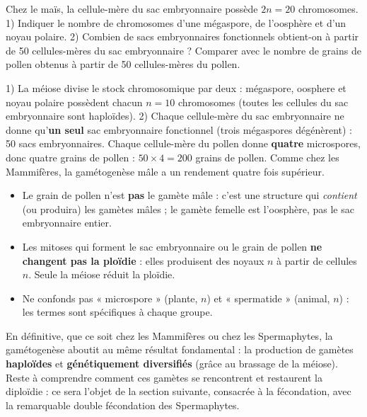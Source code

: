\documentclass[11pt]{article}
\begin{document}
\begin{exercice}
Chez le maïs, la cellule-mère du sac embryonnaire possède $2n = 20$ chromosomes. 1) Indiquer le nombre de chromosomes d'une mégaspore, de l'oosphère et d'un noyau polaire. 2) Combien de sacs embryonnaires fonctionnels obtient-on à partir de 50 cellules-mères du sac embryonnaire ? Comparer avec le nombre de grains de pollen obtenus à partir de 50 cellules-mères du pollen.
\end{exercice}

\begin{corrige}[Exercice]
1) La méiose divise le stock chromosomique par deux : mégaspore, oosphere et noyau polaire possèdent chacun $n = 10$ chromosomes (toutes les cellules du sac embryonnaire sont haploïdes). 2) Chaque cellule-mère du sac embryonnaire ne donne qu'\textbf{un seul} sac embryonnaire fonctionnel (trois mégaspores dégénèrent) : 50 sacs embryonnaires. Chaque cellule-mère du pollen donne \textbf{quatre} microspores, donc quatre grains de pollen : $50 \times 4 = 200$ grains de pollen. Comme chez les Mammifères, la gamétogenèse mâle a un rendement quatre fois supérieur.
\end{corrige}

\begin{attention}
\begin{itemize}
\item Le grain de pollen n'est \textbf{pas} le gamète mâle : c'est une structure qui \emph{contient} (ou produira) les gamètes mâles ; le gamète femelle est l'oosphère, pas le sac embryonnaire entier.
\item Les mitoses qui forment le sac embryonnaire ou le grain de pollen \textbf{ne changent pas la ploïdie} : elles produisent des noyaux $n$ à partir de cellules $n$. Seule la méiose réduit la ploïdie.
\item Ne confonds pas « microspore » (plante, $n$) et « spermatide » (animal, $n$) : les termes sont spécifiques à chaque groupe.
\end{itemize}
\end{attention}

En définitive, que ce soit chez les Mammifères ou chez les Spermaphytes, la gamétogenèse aboutit au même résultat fondamental : la production de gamètes \textbf{haploïdes} et \textbf{génétiquement diversifiés} (grâce au brassage de la méiose). Reste à comprendre comment ces gamètes se rencontrent et restaurent la diploïdie : ce sera l'objet de la section suivante, consacrée à la fécondation, avec la remarquable double fécondation des Spermaphytes.
\end{document}
